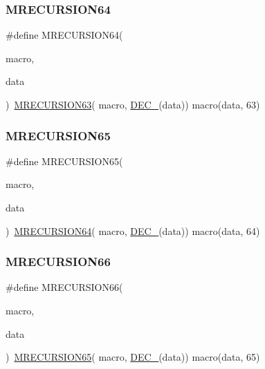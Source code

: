 \subsubsection{\texorpdfstring{MRECURSION64}{MRECURSION64}}
{\footnotesize\ttfamily \#define M\+R\+E\+C\+U\+R\+S\+I\+O\+N64(\begin{DoxyParamCaption}\item[{}]{macro,  }\item[{}]{data }\end{DoxyParamCaption})~\mbox{\hyperlink{group__group__sam0__utils__mrecursion_gacb4f4ed0c1f5953daf02b6887354c2f4}{M\+R\+E\+C\+U\+R\+S\+I\+O\+N63}}(  macro, \mbox{\hyperlink{group__group__sam0__utils__mrecursion_ga1d23d683797679dca8c3512a54a5dcae}{D\+E\+C\+\_\+}}(data))   macro(data, 63)}

\mbox{\label{group__group__sam0__utils__mrecursion_ga559cd98b41f57003d86b982477bad6bb}} 
\subsubsection{\texorpdfstring{MRECURSION65}{MRECURSION65}}
{\footnotesize\ttfamily \#define M\+R\+E\+C\+U\+R\+S\+I\+O\+N65(\begin{DoxyParamCaption}\item[{}]{macro,  }\item[{}]{data }\end{DoxyParamCaption})~\mbox{\hyperlink{group__group__sam0__utils__mrecursion_gada0aad0d480e150d9fd5621e3769f397}{M\+R\+E\+C\+U\+R\+S\+I\+O\+N64}}(  macro, \mbox{\hyperlink{group__group__sam0__utils__mrecursion_ga1d23d683797679dca8c3512a54a5dcae}{D\+E\+C\+\_\+}}(data))   macro(data, 64)}

\mbox{\label{group__group__sam0__utils__mrecursion_gae1bc9072af8c0a3690822abcf9100937}} 
\subsubsection{\texorpdfstring{MRECURSION66}{MRECURSION66}}
{\footnotesize\ttfamily \#define M\+R\+E\+C\+U\+R\+S\+I\+O\+N66(\begin{DoxyParamCaption}\item[{}]{macro,  }\item[{}]{data }\end{DoxyParamCaption})~\mbox{\hyperlink{group__group__sam0__utils__mrecursion_ga559cd98b41f57003d86b982477bad6bb}{M\+R\+E\+C\+U\+R\+S\+I\+O\+N65}}(  macro, \mbox{\hyperlink{group__group__sam0__utils__mrecursion_ga1d23d683797679dca8c3512a54a5dcae}{D\+E\+C\+\_\+}}(data))   macro(data, 65)}

